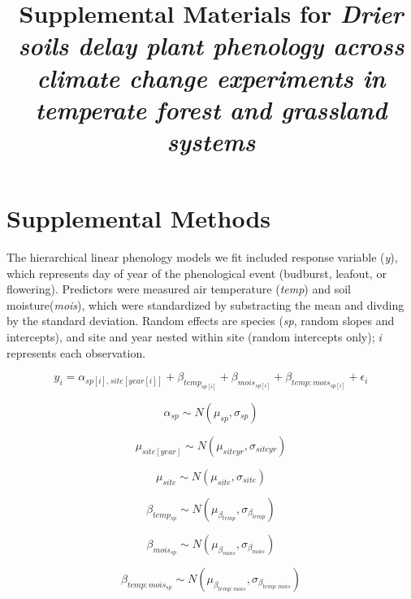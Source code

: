 \documentclass{article}
\begin{document}


\title{Supplemental Materials for \emph{Drier soils delay plant phenology across climate change experiments in temperate forest and grassland systems}}


\section* {Supplemental Methods}
\par The hierarchical linear phenology models we fit included response variable (\textit{y}), which represents day of year of the phenological event (budburst, leafout, or flowering). Predictors were measured air temperature (\textit{temp}) and soil moisture(\textit{mois}), which were standardized by substracting the mean and divding by the standard deviation. Random effects are species (\textit{sp}, random slopes and intercepts), and site and year nested within site (random intercepts only); $i$ represents each observation. 

\begin{equation}
y_{i}=\alpha_{sp[i],site[year[i]]} + \beta_{temp_{sp[i]}}+ \beta_{mois_{sp[i]}} + \beta_{temp:mois_{sp[i]}}+\epsilon_{i}\label{eq:8}
\end{equation}

\begin{equation}
\alpha_{sp}\sim N(\mu_{sp}, \sigma_{sp})
\end{equation}

\begin{equation}
\mu_{site[year]} \sim N(\mu_{siteyr}, \sigma_{siteyr})
\end{equation}

\begin{equation}
\mu_{site} \sim N(\mu_{site}, \sigma_{site})
\end{equation}

\begin{equation}
\beta_{temp_{sp}} \sim N(\mu_{\beta_{temp}}, \sigma_{\beta_{temp}})
\end{equation}

\begin{equation}
\beta_{mois_{sp}} \sim N(\mu_{\beta_{mois}}, \sigma_{\beta_{mois}})
\end{equation}

\begin{equation}
\beta_{temp:mois_{sp}} \sim N(\mu_{\beta_{temp:mois}}, \sigma_{\beta_{temp:mois}})
\end{equation}
\end{document}
